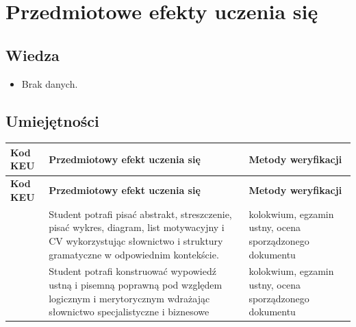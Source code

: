 \documentclass[12pt, a4paper]{article}
\newcommand{\thdrule}{\noalign{\global\setlength{\extrarowheight}{0pt}}}
\newcommand{\thdend}{\noalign{\global\setlength{\extrarowheight}{3pt}}}
\begin{document}
\section{Przedmiotowe efekty uczenia się}

\subsection*{Wiedza}
\begin{itemize}
  \item Brak danych.
\end{itemize}

\subsection*{Umiejętności}
{\scriptsize
\begin{longtable}{m{1.6cm}m{9.0cm}m{4.2cm}}
\thdrule\toprule
\rowcolor{pjatkRed} {\color{white}\footnotesize\textbf{\vphantom{Ag}Kod KEU}} & {\color{white}\footnotesize\textbf{\vphantom{Ag}Przedmiotowy efekt uczenia się}} & {\color{white}\footnotesize\textbf{\vphantom{Ag}Metody weryfikacji}} \\
\midrule\thdend
\endfirsthead
\thdrule\toprule
\rowcolor{pjatkRed} {\color{white}\footnotesize\textbf{\vphantom{Ag}Kod KEU}} & {\color{white}\footnotesize\textbf{\vphantom{Ag}Przedmiotowy efekt uczenia się}} & {\color{white}\footnotesize\textbf{\vphantom{Ag}Metody weryfikacji}} \\
\midrule\thdend
\endhead
  \rowcolor{tableRowLight}  & Student potrafi pisać abstrakt, streszczenie, pisać wykres, diagram, list motywacyjny i CV wykorzystując słownictwo i struktury gramatyczne w odpowiednim kontekście. & kolokwium, egzamin ustny, ocena sporządzonego dokumentu \\
  \rowcolor{tableRowAlt}  & Student potrafi konstruować wypowiedź ustną i pisemną poprawną pod względem logicznym i merytorycznym wdrażając słownictwo specjalistyczne i biznesowe & kolokwium, egzamin ustny, ocena sporządzonego dokumentu \\
\bottomrule
\end{longtable}}
\end{document}
